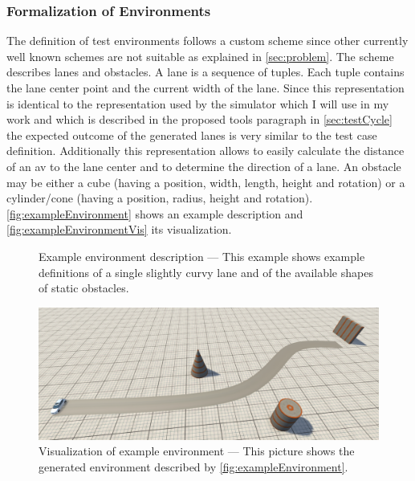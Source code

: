 \subsubsection{Formalization of Environments}
The definition of test environments follows a custom scheme since other currently well known schemes are not suitable as explained in \autoref{sec:problem}.
The scheme describes lanes and obstacles.
A lane is a sequence of tuples.
Each tuple contains the lane center point and the current width of the lane.
Since this representation is identical to the representation used by the simulator which I will use in my work and which is described in the proposed tools paragraph in \autoref{sec:testCycle} the expected outcome of the generated lanes is very similar to the test case definition.
Additionally this representation allows to easily calculate the distance of an \gls{av} to the lane center and to determine the direction of a lane.
An obstacle may be either a cube (having a position, width, length, height and rotation) or a cylinder/cone (having a position, radius, height and rotation).
\autoref{fig:exampleEnvironment} shows an example description and \autoref{fig:exampleEnvironmentVis} its visualization.
\begin{figure}
    \caption{Example environment description --- This example shows example definitions of a single slightly curvy lane and of the available shapes of static obstacles.}\label{fig:exampleEnvironment}
    \medskip
    
\end{figure}
\begin{figure}
    \caption{Visualization of example environment --- This picture shows the generated environment described by \autoref{fig:exampleEnvironment}.}\label{fig:exampleEnvironmentVis}
    \medskip
    \includegraphics[width=\linewidth]{pictures/2019-06-04_simpleLaneWithObstacles.png}
\end{figure}
